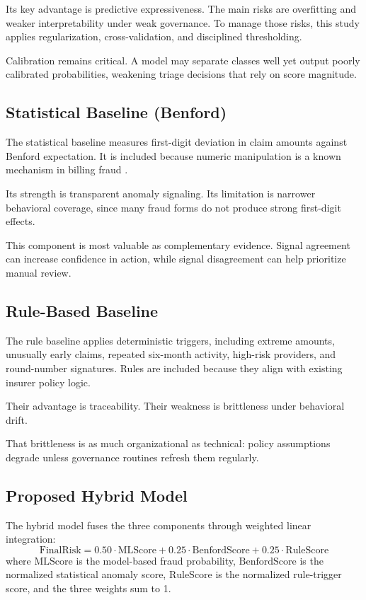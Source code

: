 \documentclass[12pt,a4paper]{report}
\begin{document}
Its key advantage is predictive expressiveness. The main risks are overfitting and weaker interpretability under weak governance. To manage those risks, this study applies regularization, cross-validation, and disciplined thresholding.

Calibration remains critical. A model may separate classes well yet output poorly calibrated probabilities, weakening triage decisions that rely on score magnitude.

\subsection{Statistical Baseline (Benford)}
The statistical baseline measures first-digit deviation in claim amounts against Benford expectation. It is included because numeric manipulation is a known mechanism in billing fraud \citep{durtschi2004}.

Its strength is transparent anomaly signaling. Its limitation is narrower behavioral coverage, since many fraud forms do not produce strong first-digit effects.

This component is most valuable as complementary evidence. Signal agreement can increase confidence in action, while signal disagreement can help prioritize manual review.

\subsection{Rule-Based Baseline}
The rule baseline applies deterministic triggers, including extreme amounts, unusually early claims, repeated six-month activity, high-risk providers, and round-number signatures. Rules are included because they align with existing insurer policy logic.

Their advantage is traceability. Their weakness is brittleness under behavioral drift.

That brittleness is as much organizational as technical: policy assumptions degrade unless governance routines refresh them regularly.

\subsection{Proposed Hybrid Model}
The hybrid model fuses the three components through weighted linear integration:
\begin{equation}
\text{FinalRisk} = 0.50\cdot\text{MLScore} + 0.25\cdot\text{BenfordScore} + 0.25\cdot\text{RuleScore}
\end{equation}
where $\text{MLScore}$ is the model-based fraud probability, $\text{BenfordScore}$ is the normalized statistical anomaly score, $\text{RuleScore}$ is the normalized rule-trigger score, and the three weights sum to 1.
\end{document}
